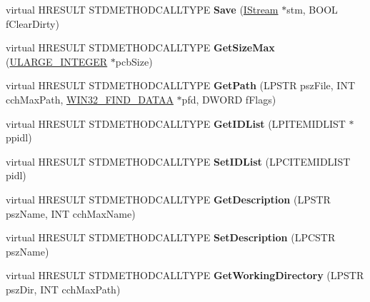 \begin{DoxyCompactItemize}
virtual H\+R\+E\+S\+U\+LT S\+T\+D\+M\+E\+T\+H\+O\+D\+C\+A\+L\+L\+T\+Y\+PE {\bfseries Save} (\hyperlink{interface_i_stream}{I\+Stream} $\ast$stm, B\+O\+OL f\+Clear\+Dirty)
\item 
\mbox{\label{class_c_shell_link_a81036ba3376f395593af05618e5e1dd7}} 
virtual H\+R\+E\+S\+U\+LT S\+T\+D\+M\+E\+T\+H\+O\+D\+C\+A\+L\+L\+T\+Y\+PE {\bfseries Get\+Size\+Max} (\hyperlink{struct___u_l_a_r_g_e___i_n_t_e_g_e_r}{U\+L\+A\+R\+G\+E\+\_\+\+I\+N\+T\+E\+G\+ER} $\ast$pcb\+Size)
\item 
\mbox{\label{class_c_shell_link_a912383ea8b971512fedb9c3a6f6547ed}} 
virtual H\+R\+E\+S\+U\+LT S\+T\+D\+M\+E\+T\+H\+O\+D\+C\+A\+L\+L\+T\+Y\+PE {\bfseries Get\+Path} (L\+P\+S\+TR psz\+File, I\+NT cch\+Max\+Path, \hyperlink{struct_w_i_n32___f_i_n_d___d_a_t_a_a}{W\+I\+N32\+\_\+\+F\+I\+N\+D\+\_\+\+D\+A\+T\+AA} $\ast$pfd, D\+W\+O\+RD f\+Flags)
\item 
\mbox{\label{class_c_shell_link_a6146c09a3309655d63a712ae6056be63}} 
virtual H\+R\+E\+S\+U\+LT S\+T\+D\+M\+E\+T\+H\+O\+D\+C\+A\+L\+L\+T\+Y\+PE {\bfseries Get\+I\+D\+List} (L\+P\+I\+T\+E\+M\+I\+D\+L\+I\+ST $\ast$ppidl)
\item 
\mbox{\label{class_c_shell_link_a3d24975bc9216cf16f88bdbd62caf3c2}} 
virtual H\+R\+E\+S\+U\+LT S\+T\+D\+M\+E\+T\+H\+O\+D\+C\+A\+L\+L\+T\+Y\+PE {\bfseries Set\+I\+D\+List} (L\+P\+C\+I\+T\+E\+M\+I\+D\+L\+I\+ST pidl)
\item 
\mbox{\label{class_c_shell_link_a04ca03db5b0cb253fb75b4360107b145}} 
virtual H\+R\+E\+S\+U\+LT S\+T\+D\+M\+E\+T\+H\+O\+D\+C\+A\+L\+L\+T\+Y\+PE {\bfseries Get\+Description} (L\+P\+S\+TR psz\+Name, I\+NT cch\+Max\+Name)
\item 
\mbox{\label{class_c_shell_link_ae6e44e75eeb739f04f08e8b01f5f8150}} 
virtual H\+R\+E\+S\+U\+LT S\+T\+D\+M\+E\+T\+H\+O\+D\+C\+A\+L\+L\+T\+Y\+PE {\bfseries Set\+Description} (L\+P\+C\+S\+TR psz\+Name)
\item 
\mbox{\label{class_c_shell_link_a0c7ae6e1b5debc5342465d82af361f6e}} 
virtual H\+R\+E\+S\+U\+LT S\+T\+D\+M\+E\+T\+H\+O\+D\+C\+A\+L\+L\+T\+Y\+PE {\bfseries Get\+Working\+Directory} (L\+P\+S\+TR psz\+Dir, I\+NT cch\+Max\+Path)

\end{DoxyCompactItemize}
